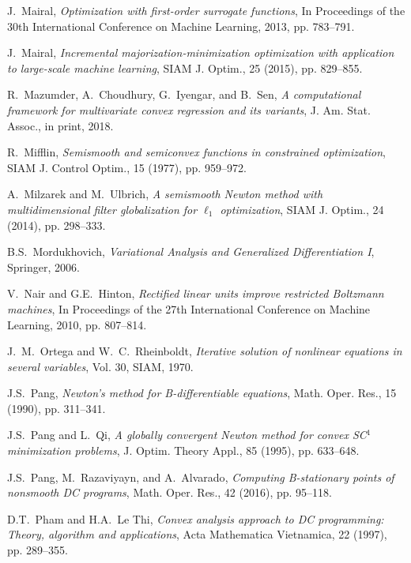 \documentclass{siamart}
\begin{document}
\begin{thebibliography}{999}
{
{\sc J.\ Mairal},
{\sl Optimization with first-order surrogate functions},
In Proceedings of the 30th International Conference on Machine Learning, 2013, pp. 783--791.

{\sc J.\ Mairal},
{\sl  Incremental majorization-minimization optimization with application to large-scale machine learning},
SIAM J. Optim., 25 (2015), pp. 829--855.

{\sc R.\ Mazumder, A.\ Choudhury, G.\ Iyengar, and B.\ Sen},
{\sl A computational framework for multivariate convex regression and its variants},
J. Am. Stat. Assoc., in print, 2018.

{\sc R.\ Mifflin},
{\sl Semismooth and semiconvex functions in constrained optimization},
SIAM J. Control Optim., 15 (1977), pp. 959--972.

{\sc A.\ Milzarek and M.\ Ulbrich},
{\sl A semismooth Newton method with multidimensional filter globalization for $\ell_1$ optimization},
SIAM J. Optim., 24 (2014), pp. 298--333.

{\sc B.S.\ Mordukhovich},
{\sl Variational Analysis and Generalized Differentiation I},
 Springer, 2006.



{\sc V.\ Nair and G.E.\ Hinton},
{\sl Rectified linear units improve restricted Boltzmann machines},
 In Proceedings of the 27th International Conference on Machine Learning,  2010, pp. 807--814.


{\sc J.\ M.\ Ortega and W.\ C.\ Rheinboldt},
{\sl Iterative solution of nonlinear equations in several variables},
 Vol. 30, SIAM,  1970.

{\sc J.S.\ Pang},
{\sl Newton's method for B-differentiable equations},
 Math. Oper. Res., 15 (1990), pp. 311--341.

{\sc J.S.\ Pang and L.\ Qi},
{\sl A globally convergent Newton method for convex SC$^1$ minimization problems},
J. Optim. Theory Appl., 85 (1995), pp. 633--648.

{\sc J.S.\ Pang, M.\ Razaviyayn, and A.\ Alvarado},
{\sl Computing B-stationary points of nonsmooth DC programs},
 Math. Oper. Res., 42 (2016), pp. 95--118.

{\sc D.T.\ Pham and H.A.\ Le Thi},
{\sl Convex analysis approach to DC programming:
Theory, algorithm and applications},
Acta Mathematica Vietnamica, 22 (1997), pp. 289--355.

}
\end{thebibliography}
\end{document}
